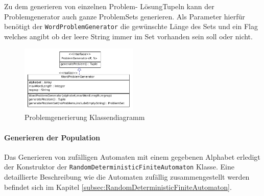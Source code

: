 Zu dem generieren von einzelnen \flqq Problem\frqq - \flqq Lösung\frqq Tupeln kann der Problemgenerator auch ganze ProblemSets generieren. Als Parameter hierfür benötigt der \lstinline$WordProblem$\lstinline$Generator$ die gewünschte Länge des Sets und ein Flag welches angibt ob der leere String immer im Set vorhanden sein soll oder nicht.

\begin{figure}[h]
  \centering
  \includegraphics[width=0.5\textwidth]{images/simple_uml_pg.pdf}
  \caption[Problemgenerierung Klassendiagramm]{Problemgenerierung Klassendiagramm}
  \label{fig:ea_pg_classdiag_simple}
\end{figure}


\paragraph{Generieren der Population}
Das Generieren von zufälligen Automaten mit einem gegebenen Alphabet erledigt der Konstruktor der \lstinline$RandomDeterministicFiniteAutomaton$ Klasse. Eine detaillierte Beschreibung wie die Automaten zufällig zusammengestellt werden befindet sich im Kapitel \ref{subsec:RandomDeterministicFiniteAutomaton}.
